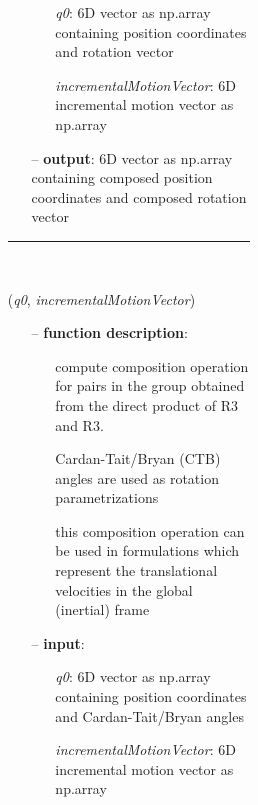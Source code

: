 \begin{itemize}[leftmargin=1.4cm]
\begin{itemize}[leftmargin=0.5cm]
\begin{itemize}[leftmargin=1.4cm]
\begin{itemize}[leftmargin=0.5cm]
\begin{itemize}[leftmargin=1.4cm]
\begin{itemize}[leftmargin=0.5cm]
\begin{itemize}[leftmargin=1.4cm]
\begin{itemize}[leftmargin=1.4cm]
\begin{itemize}[leftmargin=1.4cm]
\begin{itemize}[leftmargin=1.4cm]
\begin{itemize}[leftmargin=0.5cm]
\begin{itemize}[leftmargin=0.7cm]
\begin{itemize}[leftmargin=1.2cm]
\setlength{\itemindent}{-0.7cm}
    \item[] {\it q0}: 6D vector as np.array containing position coordinates and rotation vector
    \item[] {\it   incrementalMotionVector}: 6D incremental motion vector as np.array
  \end{itemize}
  \item[--]  {\bf output}: 6D vector as np.array containing composed position coordinates and composed rotation vector\vspace{12pt}\end{itemize}
%
\noindent\rule{8cm}{0.75pt}\vspace{1pt} \\ 
\begin{flushleft}
\label{sec:lieGroupBasics:CompositionRuleDirectProductR3AndR3RotXYZAngles}
({\it q0}, {\it incrementalMotionVector})
\end{flushleft}
\setlength{\itemindent}{0.7cm}
\begin{itemize}[leftmargin=0.7cm]
  \item[--]  {\bf function description}: \vspace{-6pt}
  \begin{itemize}[leftmargin=1.2cm]
\setlength{\itemindent}{-0.7cm}
    \item[] compute composition operation for pairs in the group obtained from the direct product of R3 and R3.
    \item[]             Cardan-Tait/Bryan (CTB) angles are used as rotation parametrizations
    \item[]             this composition operation can be used in formulations which represent the translational velocities in the global (inertial) frame
  \end{itemize}
  \item[--]  {\bf input}: \vspace{-6pt}
  \begin{itemize}[leftmargin=1.2cm]
\setlength{\itemindent}{-0.7cm}
    \item[] {\it q0}: 6D vector as np.array containing position coordinates and Cardan-Tait/Bryan angles
    \item[] {\it   incrementalMotionVector}: 6D incremental motion vector as np.array
  \end{itemize}

\end{itemize}
\end{itemize}
\end{itemize}
\end{itemize}
\end{itemize}
\end{itemize}
\end{itemize}
\end{itemize}
\end{itemize}
\end{itemize}
\end{itemize}
\end{itemize}
